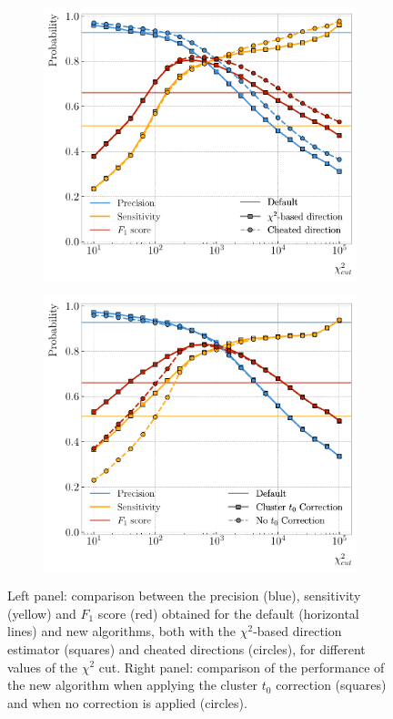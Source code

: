 \begin{figure}[t]
	\begin{subfigure}{0.5\textwidth}
		\centering
		\includegraphics[width=.90\linewidth]{Images/GArSoft_PID/associations/helix_propagation_metrics_no_t0.pdf}
	\end{subfigure}
	\begin{subfigure}{0.5\textwidth}
		\centering
		\includegraphics[width=.90\linewidth]{Images/GArSoft_PID/associations/helix_propagation_metrics_ecal.pdf}
	\end{subfigure}
	\caption[Performance of the new track-cluster association algorithm for different values of the $\chi^{2}$ cut.]{Left panel: comparison between the precision (blue), sensitivity (yellow) and $F_{1}$ score (red) obtained for the default (horizontal lines) and new algorithms, both with the $\chi^{2}$-based direction estimator (squares) and cheated directions (circles), for different values of the $\chi^{2}$ cut. Right panel: comparison of the performance of the new algorithm when applying the cluster $t_{0}$ correction (squares) and when no correction is applied (circles).}
	\label{fig:associations}
\end{figure}

